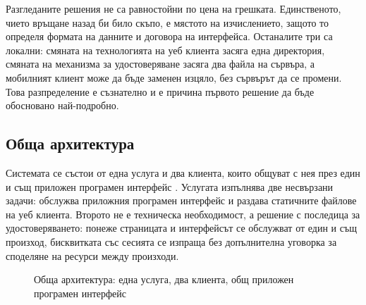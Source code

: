 Разгледаните решения не са равностойни по цена на грешката. Единственото, чието
връщане назад би било скъпо, е мястото на изчислението, защото то определя формата на
данните и договора на интерфейса. Останалите три са локални: смяната на технологията
на уеб клиента засяга една директория, смяната на механизма за удостоверяване засяга
два файла на сървъра, а мобилният клиент може да бъде заменен изцяло, без сървърът да
се промени. Това разпределение е съзнателно и е причина първото решение да бъде
обосновано най-подробно.

\subsection{Обща архитектура}
\label{subsec:arch}

Системата се състои от една услуга и два клиента, които общуват с нея през един и същ
приложен програмен интерфейс . Услугата изпълнява две несвързани
задачи: обслужва приложния програмен интерфейс и раздава статичните файлове на уеб
клиента. Второто не е техническа необходимост, а решение с последица за
удостоверяването: понеже страницата и интерфейсът се обслужват от един и същ произход,
бисквитката със сесията се изпраща без допълнителна уговорка за споделяне на ресурси
между произходи.

\begin{figure}[htbp]
\centering
{}
\caption{Обща архитектура: една услуга, два клиента, общ приложен програмен интерфейс}
\label{fig:arch}
\end{figure}

